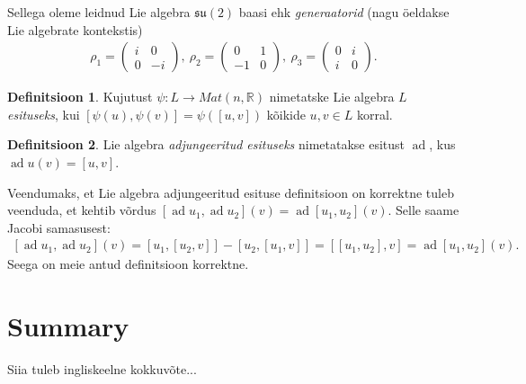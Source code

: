 \documentclass[a4paper,12pt]{article}
\theoremstyle{plain}
\theoremstyle{definition}
\newtheorem{definitsioon}{Definitsioon}[section]
\numberwithin{equation}{section}
\DeclareMathOperator{\ad}{ad}
\begin{document}
Sellega oleme leidnud Lie algebra $\mathfrak{su}\left(2\right)$ baasi ehk \emph{generaatorid} (nagu öeldakse Lie algebrate kontekstis)
\begin{align*}
\rho_1 = \begin{pmatrix} i & 0 \\ 0 & -i \end{pmatrix},\ \rho_2 = \begin{pmatrix} 0 & 1 \\ -1 & 0 \end{pmatrix},\ \rho_3 = \begin{pmatrix} 0 & i \\ i & 0 \end{pmatrix}.
\end{align*}
\begin{definitsioon}
Kujutust $\psi : L \rightarrow Mat\left(n, \mathbb{R}\right)$ nimetatske Lie algebra $L$ \emph{esituseks}, kui $\left[\psi\left(u\right), \psi\left(v\right)\right] = \psi\left(\left[u, v\right]\right)$ kõikide $u, v \in L$ korral. 
\end{definitsioon}

\begin{definitsioon}
Lie algebra \emph{adjungeeritud esituseks} nimetatakse esitust $\ad$, kus $\ad u \left(v\right) = \left[u, v\right]$.
\end{definitsioon}
Veendumaks, et Lie algebra adjungeeritud esituse definitsioon on korrektne tuleb veenduda, et kehtib võrdus $\left[\ad u_1, \ad u_2 \right] \left(v\right) = \ad \left[u_1, u_2 \right] \left(v\right)$. Selle saame Jacobi samasusest:
\begin{align*}
\left[\ad u_1, \ad u_2 \right] \left(v\right) = \left[u_1, \left[u_2, v\right]\right ] - \left[u_2, \left[u_1, v\right]\right] = \left[\left[u_1, u_2\right], v\right] = 
\ad \left[u_1, u_2 \right] \left(v\right).
\end{align*}
Seega on meie antud definitsioon korrektne.




\newpage
\section*{Summary}
Siia tuleb ingliskeelne kokkuvõte...

\newpage
{}


\end{document}
